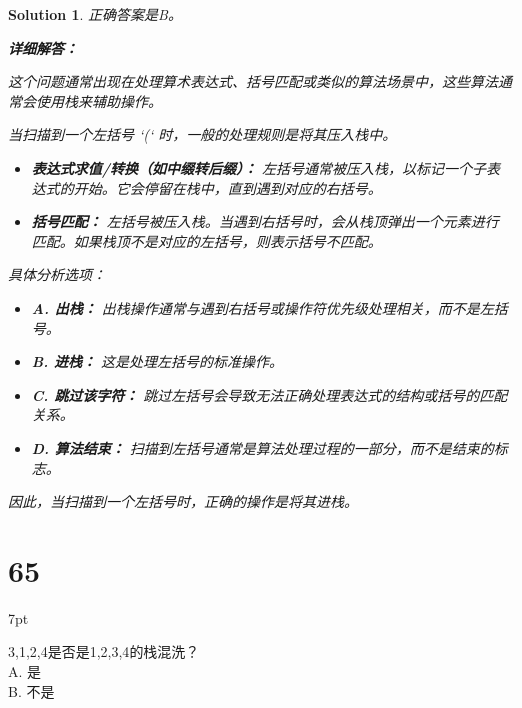 \documentclass[UTF8]{report}
\newtheorem{solution}{Solution}
\theoremstyle{MyLineTheoremStyle} %
\theoremstyle{MyBlockTheoremStyle} %
\theoremstyle{MySubsubsectionStyle} %
\newenvironment{graybox}{%
        \def\FrameCommand{%
        \hspace{1pt}%
        {\color{gray}\small \vrule width 2pt}%
        {\color{graybox_color}\vrule width 4pt}%
        \colorbox{graybox_color}%
        }%
        \MakeFramed{\advance\hsize-\width\FrameRestore}%
        \noindent\hspace{-4.55pt}%
        \begin{adjustwidth}{}{7pt}%
        \vspace{2pt}\vspace{2pt}%
        }
        {%
        \vspace{2pt}\end{adjustwidth}\endMakeFramed%
        }
\begin{document}
\begin{solution}
正确答案是B。

\textbf{详细解答：}

这个问题通常出现在处理算术表达式、括号匹配或类似的算法场景中，这些算法通常会使用栈来辅助操作。

当扫描到一个左括号 `(` 时，一般的处理规则是将其压入栈中。
\begin{itemize}
    \item \textbf{表达式求值/转换（如中缀转后缀）：} 左括号通常被压入栈，以标记一个子表达式的开始。它会停留在栈中，直到遇到对应的右括号。
    \item \textbf{括号匹配：} 左括号被压入栈。当遇到右括号时，会从栈顶弹出一个元素进行匹配。如果栈顶不是对应的左括号，则表示括号不匹配。
\end{itemize}

具体分析选项：
\begin{itemize}
    \item \textbf{A. 出栈：} 出栈操作通常与遇到右括号或操作符优先级处理相关，而不是左括号。
    \item \textbf{B. 进栈：} 这是处理左括号的标准操作。
    \item \textbf{C. 跳过该字符：} 跳过左括号会导致无法正确处理表达式的结构或括号的匹配关系。
    \item \textbf{D. 算法结束：} 扫描到左括号通常是算法处理过程的一部分，而不是结束的标志。
\end{itemize}

因此，当扫描到一个左括号时，正确的操作是将其进栈。
\end{solution}

\section*{65}
\begin{graybox}
{3,1,2,4}是否是{1,2,3,4}的栈混洗？\\
A. 是 \\
B. 不是
\end{graybox}
\end{document}
